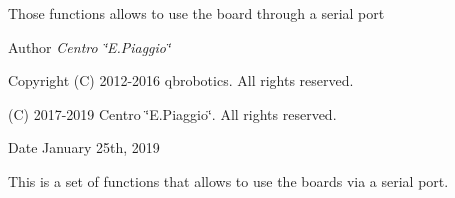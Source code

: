 Those functions allows to use the board through a serial port\begin{DoxyAuthor}{Author}
{\itshape Centro \char`\"{}\+E.\+Piaggio\char`\"{}} 
\end{DoxyAuthor}
\begin{DoxyCopyright}{Copyright}
(C) 2012-\/2016 qbrobotics. All rights reserved. 

(C) 2017-\/2019 Centro \char`\"{}\+E.\+Piaggio\char`\"{}. All rights reserved.
\end{DoxyCopyright}
\begin{DoxyDate}{Date}
January 25th, 2019
\end{DoxyDate}
This is a set of functions that allows to use the boards via a serial port. 